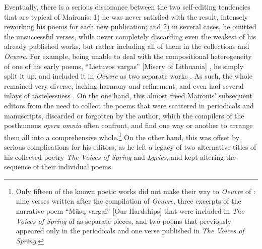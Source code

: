 \begin{paper}
Eventually, there is a serious dissonance between the two self-editing
tendencies that are typical of Maironis: 1) he was never satisfied with the result,
intensely reworking his poems for each new publication; and 2) in several
cases, he omitted the unsuccessful verses, while never completely discarding even
the weakest of his already published works, but rather including all of them in
the collections and \emph{Oeuvre}. For example, being unable to deal
with the compositional heterogeneity of one of his early poems,
``Lietuvos vargas'' [Misery of Lithuania] \citep{maironis_lietuvos_1885}, he simply
split it up, and included it in \emph{Oeuvre} as two separate works \citep[50--51]{maironis_maironio_1927}. As such, the whole remained very diverse, lacking harmony and
refinement, and even had several inlays of tastelessness \citep[80]{sauka_gedicht_1998}. On the one hand, this almost freed Maironis'  subsequent
editors from the need to collect the
poems that were scattered in periodicals and manuscripts, discarded or forgotten
by the author, which the compilers of the posthumous \emph{opera omnia}
often confront, and find one way or another to arrange them all into a comprehensive whole.\footnote{Only fifteen of the known poetic works did not
  make their way to \emph{Oeuvre} of \citeyear{maironis_maironio_1927}: nine verses written after
  the compilation of \emph{Oeuvre}, three excerpts of the narrative poem
  ``Mūsų vargai'' [Our Hardships] that were included in \emph{The
  Voices of Spring} of \citeyear{maironis_pavasario_1920} as separate pieces, and two poems that
  previously appeared only in the periodicals and one verse published in
  \emph{The Voices of Spring}.} On the other hand, this was offset by serious
complications for his editors, as he left a legacy of two alternative titles of his collected poetry \emph{The Voices of Spring} and \emph{Lyrics}, and kept altering the sequence of their individual poems.


\end{paper}
